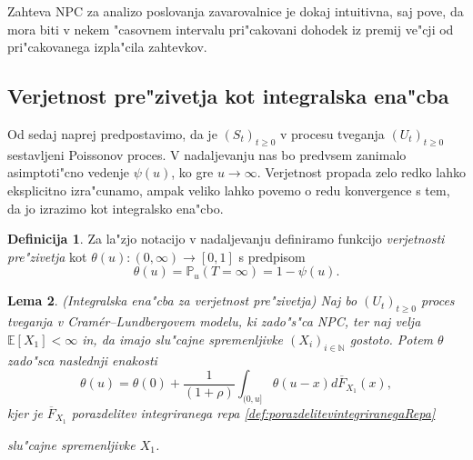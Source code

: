 \documentclass[12pt, a4paper, reqno]{amsart}
\theoremstyle{definition}
\newtheorem{definicija}{Definicija}[section]
\theoremstyle{plain}
\newtheorem{lema}[definicija]{Lema}
\newcommand{\N}{\mathbb{N}}
\newcommand{\E}{\mathbb{E}}
\newcommand{\Prob}{\mathbb{P}}
\newcommand{\1}{\mathds{1}}
\newcommand*{\refPriloga}[1]{%
  \begingroup
    \hypersetup{
      linkcolor=properpurple,
      linkbordercolor=properpurple,
    }%
    \ref{#1}%
  \endgroup
}
\begin{document}
        Zahteva NPC za analizo poslovanja zavarovalnice je dokaj intuitivna, saj pove, da mora  
        biti v nekem "casovnem intervalu pri"cakovani dohodek iz premij ve"cji od pri"cakovanega izpla"cila zahtevkov.

    \subsection{Verjetnost pre"zivetja kot integralska ena"cba} Od sedaj naprej predpostavimo, 
    da je $(S_t)_{t\geq0}$ v procesu tveganja $(U_t)_{t\geq0}$ sestavljeni Poissonov proces. V nadaljevanju nas bo predvsem zanimalo asimptoti"cno 
        vedenje $\psi(u)$, ko gre $u\rightarrow\infty$. Verjetnost propada zelo redko lahko eksplicitno 
        izra"cunamo, ampak veliko lahko povemo o redu konvergence s tem, da jo izrazimo kot integralsko
        ena"cbo. 

    \begin{definicija}
        Za la"zjo notacijo v nadaljevanju definiramo funkcijo \textit{verjetnosti pre"zivetja} kot
        $\theta(u):(0, \infty) \to [0, 1]$ s predpisom
        \begin{equation*}
            \theta(u) = \Prob_u\left(T=\infty\right) = 1 - \psi(u).
        \end{equation*}
        \label{def:verjetnostPrezivetja}
    \end{definicija}

    \begin{lema}(Integralska ena"cba za verjetnost pre"zivetja)
        Naj bo $(U_t)_{t\geq0}$ proces tveganja v Cramér--Lundbergovem modelu, ki zado"s"ca NPC, ter naj 
        velja $\E\left[X_1\right]<\infty$ in, da imajo slu"cajne spremenljivke $(X_i)_{i\in\N}$ 
        gostoto. Potem $\theta$ zado"sca naslednji enakosti
        \begin{equation}
            \theta(u) = \theta(0) + \frac{1}{(1+\rho)} \int_{(0, u]}\theta(u - x)d\overline{F}_{X_1}(x),
            \label{eq:verjetnostPrezivetja}
        \end{equation}
        kjer je $\overline{F}_{X_1}$ porazdelitev integriranega repa \refPriloga{def:porazdelitevintegriranegaRepa} 
        slu"cajne spremenljivke $X_1$.
        \label{lema:verjetnostPrezivetja}
    \end{lema}
\end{document}
